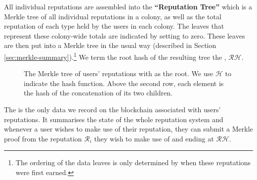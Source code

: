 All individual reputations are assembled into the \textbf{``Reputation Tree''} which is a Merkle tree of all individual reputations in a colony, as well as the total reputation of each type held by the users in each colony. The leaves that represent these colony-wide totals are indicated by setting  to zero. These leaves are then put into a Merkle tree in the usual way (described in Section \ref{sec:merkle-summary}).\footnote{The ordering of the data leaves is only determined by when these reputations were first earned.} We term the root hash of the resulting tree the , $\mathcal{RH}$.
\begin{figure}
\centering
{}
\caption{The Merkle tree of users' reputations with  as the root. We use $\mathcal{H}$ to indicate the  hash function. Above the second row, each element is the hash of the concatenation of its two children.}
\end{figure}


The  is the only data we record on the blockchain associated with users' reputations. It summarises the state of the whole reputation system and whenever a user wishes to make use of their reputation, they can submit a Merkle proof from the reputation $\mathcal{R}_i$ they wish to make use of and ending at $\mathcal{RH}$.

